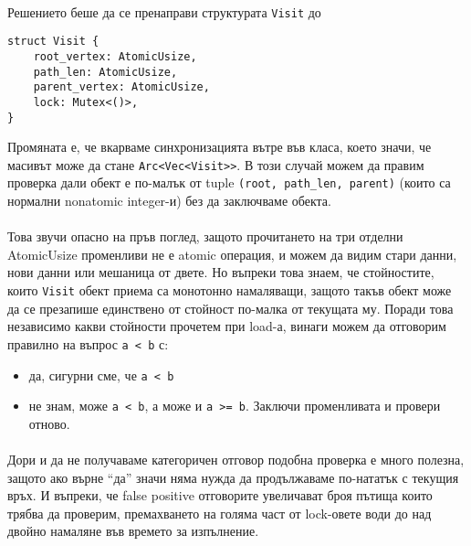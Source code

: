 \paragraph*{} Решението беше да се пренаправи структурата \verb|Visit| до
\begin{verbatim}
struct Visit {
    root_vertex: AtomicUsize,
    path_len: AtomicUsize,
    parent_vertex: AtomicUsize,
    lock: Mutex<()>,
}
\end{verbatim}
Промяната е, че вкарваме синхронизацията вътре във класа, което значи, че масивът може да стане \verb|Arc<Vec<Visit>>|. В този случай можем да правим проверка дали обект е по-малък от tuple \verb|(root, path_len, parent)| (които са нормални nonatomic integer-и) без да заключваме обекта.

\paragraph*{} Това звучи опасно на пръв поглед, защото прочитането на три отделни AtomicUsize променливи не е atomic операция, и можем да видим стари данни, нови данни или мешаница от двете. Но въпреки това знаем, че стойностите, които \verb|Visit| обект приема са монотонно намаляващи, защото такъв обект може да се презапише единствено от стойност по-малка от текущата му. Поради това независимо какви стойности прочетем при load-а, винаги можем да отговорим правилно на въпрос \verb|a < b| с:
\begin{itemize}
\item да, сигурни сме, че \verb|a < b|
\item не знам, може \verb|a < b|, а може и \verb|a >= b|. Заключи променливата и провери отново.
\end{itemize}

\paragraph*{} Дори и да не получаваме категоричен отговор подобна проверка е много полезна, защото ако върне ``да'' значи няма нужда да продължаваме по-нататък с текущия връх. И въпреки, че false positive отговорите увеличават броя пътища които трябва да проверим, премахването на голяма част от lock-овете води до над двойно намаляне във времето за изпълнение.
